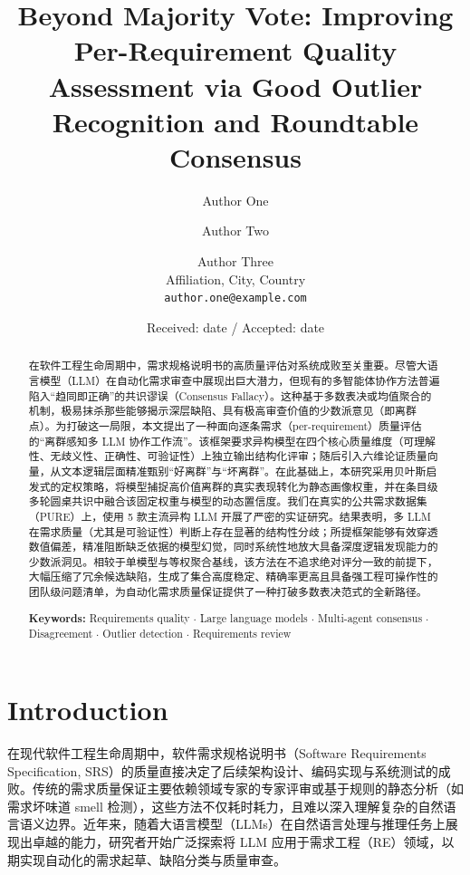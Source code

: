 \documentclass[a4paper,11pt]{ctexart}
\begin{document}
\title{Beyond Majority Vote: Improving Per-Requirement Quality Assessment via Good Outlier Recognition and Roundtable Consensus}

\author{Author One \and Author Two \and Author Three \\[4pt]
\small Affiliation, City, Country \\
\small \texttt{author.one@example.com}}

\date{Received: date / Accepted: date}

\maketitle

\begin{abstract}
在软件工程生命周期中，需求规格说明书的高质量评估对系统成败至关重要。尽管大语言模型（LLM）在自动化需求审查中展现出巨大潜力，但现有的多智能体协作方法普遍陷入“趋同即正确”的共识谬误（Consensus Fallacy）。这种基于多数表决或均值聚合的机制，极易抹杀那些能够揭示深层缺陷、具有极高审查价值的少数派意见（即离群点）。为打破这一局限，本文提出了一种面向逐条需求（per-requirement）质量评估的“离群感知多 LLM 协作工作流”。该框架要求异构模型在四个核心质量维度（可理解性、无歧义性、正确性、可验证性）上独立输出结构化评审；随后引入六维论证质量向量，从文本逻辑层面精准甄别“好离群”与“坏离群”。在此基础上，本研究采用贝叶斯启发式的定权策略，将模型捕捉高价值离群的真实表现转化为静态画像权重，并在条目级多轮圆桌共识中融合该固定权重与模型的动态置信度。我们在真实的公共需求数据集（PURE）上，使用 5 款主流异构 LLM 开展了严密的实证研究。结果表明，多 LLM 在需求质量（尤其是可验证性）判断上存在显著的结构性分歧；所提框架能够有效穿透数值偏差，精准阻断缺乏依据的模型幻觉，同时系统性地放大具备深度逻辑发现能力的少数派洞见。相较于单模型与等权聚合基线，该方法在不追求绝对评分一致的前提下，大幅压缩了冗余候选缺陷，生成了集合高度稳定、精确率更高且具备强工程可操作性的团队级问题清单，为自动化需求质量保证提供了一种打破多数表决范式的全新路径。

\medskip
\noindent\textbf{Keywords:} Requirements quality $\cdot$ Large language models $\cdot$ Multi-agent consensus $\cdot$ Disagreement $\cdot$ Outlier detection $\cdot$ Requirements review
\end{abstract}

\section{Introduction}
\label{sec:introduction}
在现代软件工程生命周期中，软件需求规格说明书（Software Requirements Specification, SRS）的质量直接决定了后续架构设计、编码实现与系统测试的成败。传统的需求质量保证主要依赖领域专家的专家评审或基于规则的静态分析（如需求坏味道 smell 检测），这些方法不仅耗时耗力，且难以深入理解复杂的自然语言语义边界。近年来，随着大语言模型（LLMs）在自然语言处理与推理任务上展现出卓越的能力，研究者开始广泛探索将 LLM 应用于需求工程（RE）领域，以期实现自动化的需求起草、缺陷分类与质量审查。
\end{document}
